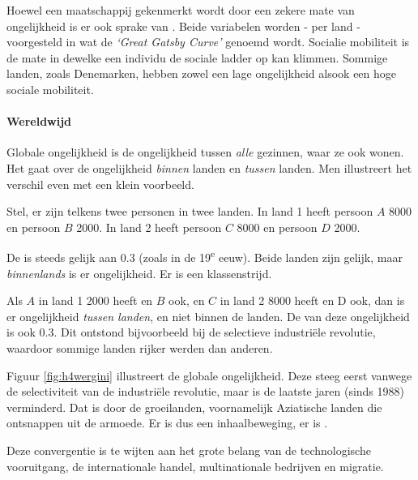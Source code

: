 \par Hoewel een maatschappij gekenmerkt wordt door een zekere mate van ongelijkheid is er ook sprake van . Beide variabelen worden - per land - voorgesteld in wat de \textit{`Great Gatsby Curve'} genoemd wordt. Socialie mobiliteit is de mate in dewelke een individu de sociale ladder op kan klimmen. Sommige landen, zoals Denemarken, hebben zowel een lage ongelijkheid alsook een hoge sociale mobiliteit.

\paragraph{Wereldwijd}

Globale ongelijkheid is de ongelijkheid tussen \textit{alle} gezinnen, waar ze ook wonen. Het gaat over de ongelijkheid \textit{binnen} landen en \textit{tussen} landen. Men illustreert het verschil even met een klein voorbeeld.\\

\par Stel, er zijn telkens twee personen in twee landen. In land 1 heeft persoon $A$ 8000 en persoon $B$ 2000. In land 2 heeft persoon $C$ 8000 en persoon $D$ 2000.
\par De  is steeds gelijk aan 0.3 (zoals in de 19\textsuperscript{e} eeuw). Beide landen zijn gelijk, maar \textit{binnenlands} is er ongelijkheid. Er is een klassenstrijd.
\par Als $A$ in land 1 2000 heeft en $B$ ook, en $C$ in land 2 8000 heeft en D ook, dan is er ongelijkheid \textit{tussen landen}, en niet binnen de landen. De  van deze ongelijkheid is ook 0.3. Dit ontstond bijvoorbeeld bij de selectieve industri\"ele revolutie, waardoor sommige landen rijker werden dan anderen.\\

\par Figuur \ref{fig:h4wergini} illustreert de globale ongelijkheid. Deze steeg eerst vanwege de selectiviteit van de industri\"ele revolutie, maar is de laatste jaren (sinds 1988) verminderd. Dat is door de groeilanden, voornamelijk Aziatische landen die ontsnappen uit de armoede. Er is dus een inhaalbeweging, er is .
\par Deze convergentie is te wijten aan het grote belang van de technologische vooruitgang, de internationale handel, multinationale bedrijven en migratie.

